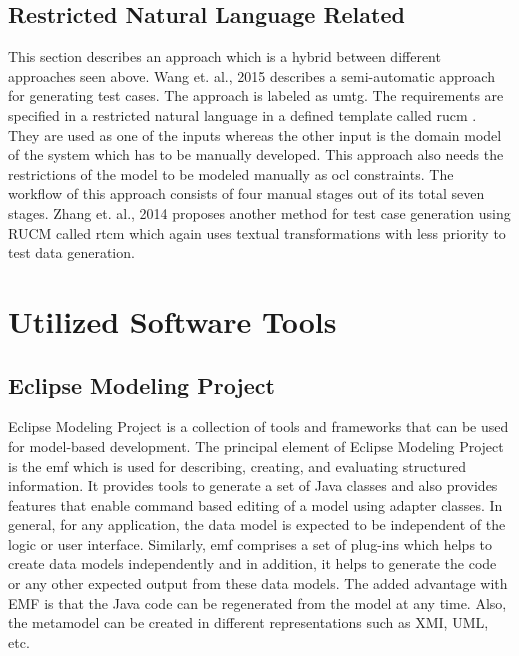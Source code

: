 \subsection{Restricted Natural Language Related}
This section describes an approach which is a hybrid between different approaches seen above. Wang et. al., 2015 \cite{wang2015automatic} describes a semi-automatic approach for generating test cases. The approach is labeled as \gls{umtg}. The requirements are specified in a restricted natural language in a defined template called \gls{rucm} \cite{yue2015rtcm}. They are used as one of the inputs whereas the other input is the domain model of the system which has to be manually developed. This approach also needs the restrictions of the model to be modeled manually as \gls{ocl} constraints. The workflow of this approach consists of four manual stages out of its total seven stages. Zhang et. al., 2014 \cite{yue2015rtcm} proposes another method for test case generation using RUCM called \gls{rtcm} which again uses textual transformations with less priority to test data generation. 

\section{Utilized Software Tools}

\subsection{Eclipse Modeling Project}
Eclipse Modeling Project \cite{eclipse} is a collection of tools and frameworks that can be used for model-based development. The principal element of Eclipse Modeling Project is the \gls{emf} which is used for describing, creating, and evaluating structured information. It provides tools to generate a set of Java classes and also provides features that enable command based editing of a model using adapter classes. In general, for any application, the data model is expected to be independent of the logic or user interface. Similarly, \gls{emf} comprises a set of plug-ins which helps to create data models independently and in addition, it helps to generate the code or any other expected output from these data models. The added advantage with EMF is that the Java code can be regenerated from the model at any time. Also, the metamodel can be created in different representations such as XMI, UML, etc. 

